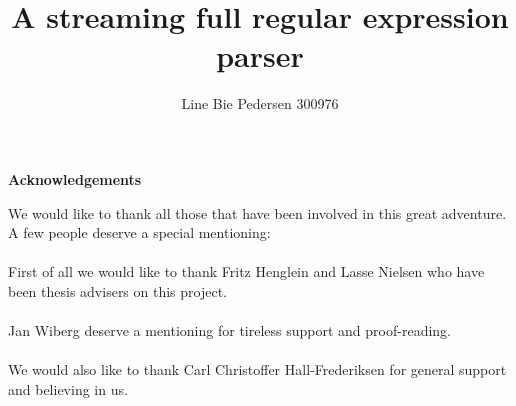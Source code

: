 \documentclass[11pt, english, a4paper]{article}
\title{A streaming full regular expression parser}
\author{Line Bie Pedersen 300976}
\date{}
\makeatletter
\newcommand\ackname{Acknowledgements}
\newenvironment{acknowledgements}{%
      \titlepage
      \null\vfil
      \@beginparpenalty\@lowpenalty
      \begin{center}%
        \bfseries \ackname
        \@endparpenalty\@M
      \end{center}}%
     {\par\vfil\null\endtitlepage}
\newenvironment{acknowledgements}{%
      \if@twocolumn
        \section*{\abstractname}%
      \else
        \small
        \begin{center}%
          {\bfseries \ackname\vspace{-.5em}\vspace{\z@}}%
        \end{center}%
        \quotation
      \fi}
      {\if@twocolumn\else\endquotation\fi}
\makeatother
\begin{document}
\maketitle
\thispagestyle{empty}
\clearpage
\setcounter{page}{1}

\clearpage
\tableofcontents
\clearpage
\listoffigures
\clearpage
\listoftables
\clearpage
\renewcommand{\listtheoremname}{List of definitions}
\listoftheorems[ignoreall, show={definition}]
\clearpage
\renewcommand{\listtheoremname}{List of examples}
\listoftheorems[ignoreall, show={example}]

\clearpage
\begin{acknowledgements}
We would like to thank all those that have been involved in this great
adventure. A few people deserve a special mentioning:\\ \\
First of all we would like to thank Fritz Henglein and Lasse Nielsen
who have been thesis advisers on this project.\\ \\
Jan Wiberg deserve a mentioning for tireless support and
proof-reading.\\  \\
We would also like to thank Carl Christoffer Hall-Frederiksen for
general support and believing in us. 
\end{acknowledgements}
\clearpage

\setcounter{page}{1} 


\clearpage

\clearpage

\clearpage

\clearpage

\clearpage

\clearpage

\clearpage

\clearpage

\clearpage

\clearpage



\clearpage
\appendix

\end{document}
